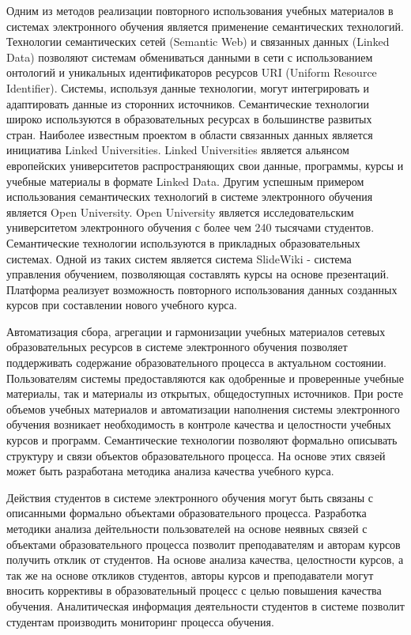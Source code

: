Одним из методов реализации повторного использования учебных материалов в системах электронного обучения является применение семантических технологий. Технологии семантических сетей (Semantic Web) и связанных данных (Linked Data) позволяют системам обмениваться данными в сети с использованием онтологий и уникальных идентификаторов ресурсов URI (Uniform Resource Identifier). Системы, используя данные технологии, могут интегрировать и адаптировать данные из сторонних источников. Семантические технологии широко используются в образовательных ресурсах в большинстве развитых стран. Наиболее известным проектом в области связанных данных является инициатива Linked Universities. Linked Universities является альянсом европейских университетов распространяющих свои данные, программы, курсы и учебные материалы в формате Linked Data. Другим успешным примером использования семантических технологий в системе электронного обучения является Open University. Open University является исследовательским университетом электронного обучения с более чем 240 тысячами студентов. Семантические технологии используются в прикладных образовательных системах. Одной из таких систем является система SlideWiki - система управления обучением, позволяющая составлять курсы на основе презентаций. Платформа реализует возможность повторного использования данных созданных курсов при составлении нового учебного курса.

Автоматизация сбора, агрегации и гармонизации учебных материалов сетевых образовательных ресурсов в системе электронного обучения позволяет поддерживать содержание образовательного процесса в актуальном состоянии. Пользователям системы предоставляются как одобренные и проверенные учебные материалы, так и материалы из открытых, общедоступных источников. При росте объемов учебных материалов и автоматизации наполнения системы электронного обучения возникает необходимость в контроле качества и целостности учебных курсов и программ. Семантические технологии позволяют формально описывать структуру и связи объектов образовательного процесса. На основе этих связей может быть разработана методика анализа качества учебного курса. 

Действия студентов в системе электронного обучения могут быть связаны с описанными формально объектами образовательного процесса. Разработка методики анализа дейтельности пользователей на основе неявных связей с объектами образовательного процесса позволит преподавателям и авторам курсов получить отклик от студентов. На основе анализа качества, целостности курсов, а так же на основе откликов студентов, авторы курсов и преподаватели могут вносить коррективы в образовательный процесс с целью повышения качества обучения. Аналитическая информация деятельности студентов в системе позволит студентам производить мониторинг процесса обучения.     


